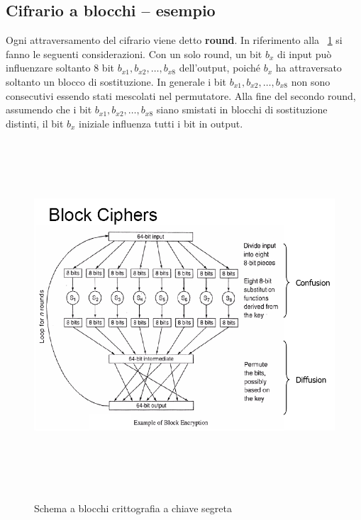 \subsection{Cifrario a blocchi – esempio}
Ogni attraversamento del cifrario viene detto \textbf{round}. In riferimento alla \figurename ~\ref{fig:block_chipher} si fanno le seguenti considerazioni. Con un solo round, un bit $b_x$ di input può influenzare soltanto 8 bit $b_{x1}, b_{x2}, …, b_{x8}$ dell'output, poiché $b_x$ ha attraversato soltanto un blocco di sostituzione. In generale i bit $b_{x1}, b_{x2}, …, b_{x8}$ non sono consecutivi essendo stati mescolati nel permutatore. Alla fine del secondo round, assumendo che i bit $b_{x1}, b_{x2}, …, b_{x8}$ siano smistati in blocchi di sostituzione distinti, il bit $b_x$ iniziale influenza tutti i bit in output.
\begin{figure}[htbp]
	\centering%
	\subfigure%
	{\includegraphics[height=13cm, width=13cm, keepaspectratio]{Immagini/chiave_segreta/block_cipher.png}}
	\caption{Schema a blocchi crittografia a chiave segreta \label{fig:block_chipher}} 	
\end{figure}

